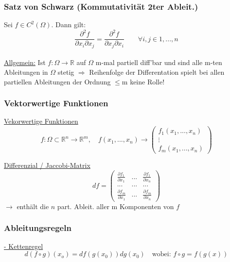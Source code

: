 \documentclass[6pt]{article}
\begin{document}
\begin{multicols*}{3}
	\subsubsection*{Satz von Schwarz (Kommutativit{\"a}t 2ter Ableit.)}
	Sei $f \in C^2(\Omega)$. Dann gilt:
	\[
			\frac{\partial^2f}{\partial x_i \partial x_j} = \frac{\partial^2f}{\partial x_j \partial x_i} \qquad \forall i,j \in {1, ..., n}
	\]
	 \vspace{2mm}\\
	\underline{Allgemein:} Ist $f: \Omega \rightarrow \mathbb{R}$ auf $\Omega$ m-mal partiell diff'bar und sind alle m-ten Ableitungen in $\Omega$ stetig $\Rightarrow$ Reihenfolge der Differentation spielt bei allen partiellen Ableitungen der Ordnung $\leq$m keine Rolle!
	\vspace{4mm}
	
	
	\subsubsection*{Vektorwertige Funktionen}
		
		\underline{Vekorwertige Funktionen}
		\begin{equation*}
				f: \Omega \subset \mathbb{R}^n \to \mathbb{R}^m, \quad f(x_1, ..., x_n) \to 
					\begin{pmatrix}
						f_1(x_1, ..., x_n) \\
						\vdots \\
						f_m(x_1, ..., x_n)
																			
					\end{pmatrix}
		\end{equation*}
		
		\underline{Differenzial / Jaccobi-Matrix}
		\begin{equation*}
				df = 
					\begin{pmatrix}
						\frac{\partial f_1}{\partial x_1} & ... & \frac{\partial f_1}{\partial x_n} \\
						... & ... & ... \\
						\frac{\partial f_m}{\partial x_1} & ... & \frac{\partial f_m}{\partial x_n}
					\end{pmatrix}
		\end{equation*}
		$\rightarrow$ enth{\"a}lt die $n$ part. Ableit. aller m Komponenten von $f$
	
	
	\subsubsection*{Ableitungsregeln}
		\underline{- Kettenregel} \\
		\[ d\left(f \circ g\right)(x_o) = df\left(g(x_0)\right) dg(x_0) \quad \text{wobei: }f \circ g  = f(g(x))\]
		

\end{multicols*}
\end{document}
